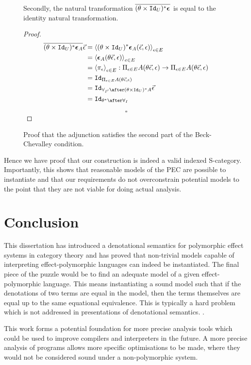 \documentclass{Report}
\begin{document}
\begin{figure}
    \begin{framed}
        
\begin{theorem}
    Secondly, the natural transformation $\overline{(\theta\times\texttt{Id}_{U})^* \boldsymbol{\epsilon}_{}}$ is equal to the identity natural transformation.

\end{theorem}

\begin{proof}
\begin{align}
    \bar{(\theta\times\Id{U})\star \counit{A}} \ev  & = \finpr{(\theta\times\Id{U})\star\counit{A}(\ev, \e)}{\e\in E}\\
    & = \finpr{\counit{A}(\theta\ev, \e)}{e\in E}\\
    & = \finpr{\pi_\e}{\e\in E}: \Pi_{\e\in E}A(\theta\ev, \e) \rightarrow \Pi_{\e\in E}A(\theta\ev, \e)\\
    & = \Id{\Pi_{\e\in E}A(\theta\ev, \e)}\\
    & = \Id{\allII\after(\theta\times\Id{U})\star A}\ev\\
    & = \Id{\theta\star\after\allI}
\end{align}

$$\square$$
\end{proof}
    \end{framed}
    \caption{Proof that the adjunction satisfies the second part of the Beck-Chevalley condition.}
    \label{BeckChevalley2}
\end{figure}


Hence we have proof that our construction is indeed a valid indexed S-category. Importantly, this shows that reasonable models of the PEC are possible to instantiate and that our requirements do not overconstrain potential models to the point that they are not viable for doing actual analysis.

\chapter{Conclusion}
This dissertation has introduced a denotational semantics for polymorphic effect systems in category theory and has proved that non-trivial models capable of interpreting effect-polymorphic languages can indeed be instantiated. The final piece of the puzzle would be to find an adequate model of a given effect-polymorphic language. This means instantiating a sound model such that if the denotations of two terms are equal in the model, then the terms themselves are equal up to the same equational equivalence. This is typically a hard problem which is not addressed in presentations of denotational semantics. .

This work forms a potential foundation for more precise analysis tools which could be used to improve compilers and interpreters in the future. A more precise analysis of programs allows more specific optimisations to be made, where they would not be considered sound under a non-polymorphic system.
\end{document}
